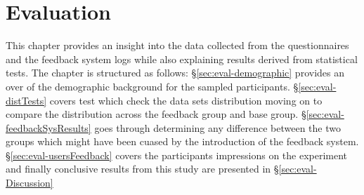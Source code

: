 \chapter{Evaluation}
This chapter provides an insight into the data collected from the questionnaires and the feedback system logs while also explaining results derived from statistical tests. The chapter is structured as follows: \S\ref{sec:eval-demographic} provides an over of the demographic background for the sampled participants. \S\ref{sec:eval-distTests} covers test which check the data sets distribution moving on to compare the distribution across the feedback group and base group. \S\ref{sec:eval-feedbackSysResults} goes through determining any difference between the two groups which might have been cuased by the introduction of the feedback system.  \S\ref{sec:eval-usersFeedback} covers the participants impressions on the experiment and finally conclusive results from this study are presented in \S\ref{sec:eval-Discussion} 

